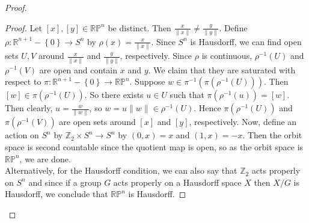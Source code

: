 \documentclass[reqno]{amsart}
\theoremstyle{definition}
\theoremstyle{remark}
\begin{document}
\begin{proof}
    \begin{proof}
        Let $\left[ x \right] , \left[ y \right]
        \in \mathbb{R}\mathbb{P}^{n}$ be distinct.
        Then $\frac{x}{\|x\|} \neq \frac{y}{\|y\|}$. Define
        $\rho  \colon \mathbb{R}^{n+1} - \left\{ 0 \right\} \to
        S^{n}$ by $\rho (x) = \frac{x}{\|x\|}$. Since $S^{n}$ is Hausdorff, we can find
        open sets $U,V$ around $\frac{x}{\|x\|}$ and $\frac{y}{\|y\|}$, respectively.
        Since $\rho$ is continuous, $\rho^{-1}(U)$ and $\rho^{-1}(V)$ are open and
        contain $x$ and $y$. We claim that they are saturated with respect to
        $\pi  \colon \mathbb{R}^{n+1} - \left\{ 0 \right\} \to
        \mathbb{R}\mathbb{P}^{n}$. Suppose
        $w \in \pi^{-1}\left( \pi \left( \rho^{-1}(U) \right)  \right) $. Then
        $\left[ w \right] \in \pi \left( \rho^{-1}(U) \right) $. So there
        exists $u \in U$ such that $\pi \left( \rho^{-1}\left( u \right)  \right)
        = \left[ w \right] $. Then clearly, $u = \frac{w}{\|w\|}$, so
        $w = u \|w\| \in \rho^{-1}(U)$. Hence
        $\pi \left( \rho^{-1}(U) \right) $ and
        $\pi\left( \rho^{-1}(V) \right) $ are open sets around
        $\left[ x \right] $ and $\left[ y \right] $, respectively.
        Now, define an action on  $S^{n}$ by
        $\mathbb{Z}_2 \times S^{n} \to S^{n}$ by
        $\left( 0, x \right) =x$ and
        $\left( 1,x \right) = -x$. Then
        the orbit space is second countable since the quotient map is
        open, so as the orbit space is $\mathbb{R}\mathbb{P}^{n}$, we are done.\\
        Alternatively, for the Hausdorff condition, we can also say that
        $\mathbb{Z}_2$ acts properly on $S^{n}$ and since if a group $G$ acts properly
        on a Hausdorff space $X$ then $X /G$ is Hausdorff, we conclude that
        $\mathbb{R}\mathbb{P}^{n}$ is Hausdorff.
        \end{proof}


\end{proof}
\end{document}

